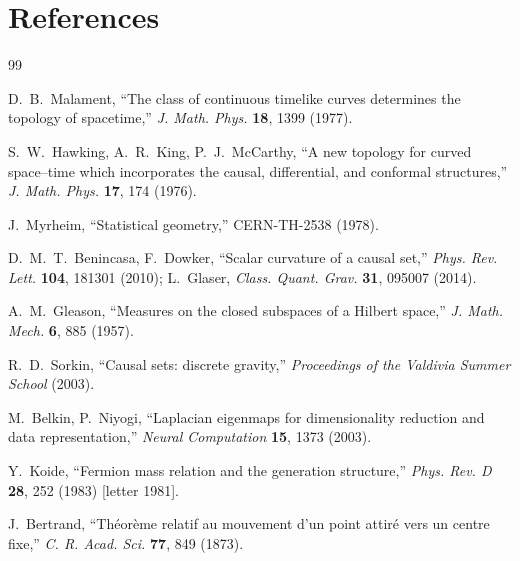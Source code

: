 \documentclass[10pt,twoside,openany]{book}
\begin{document}

\chapter{References}
\label{app:references}

\begin{thebibliography}{99}

D.~B.~Malament, ``The class of continuous timelike curves determines the topology of
spacetime,'' \emph{J. Math. Phys.} \textbf{18}, 1399 (1977).

S.~W.~Hawking, A.~R.~King, P.~J.~McCarthy, ``A new topology for curved space--time which
incorporates the causal, differential, and conformal structures,'' \emph{J. Math. Phys.}
\textbf{17}, 174 (1976).

J.~Myrheim, ``Statistical geometry,'' CERN-TH-2538 (1978).

D.~M.~T.~Benincasa, F.~Dowker, ``Scalar curvature of a causal set,'' \emph{Phys. Rev. Lett.}
\textbf{104}, 181301 (2010); L.~Glaser, \emph{Class. Quant. Grav.} \textbf{31}, 095007
(2014).

A.~M.~Gleason, ``Measures on the closed subspaces of a Hilbert space,''
\emph{J. Math. Mech.} \textbf{6}, 885 (1957).

R.~D.~Sorkin, ``Causal sets: discrete gravity,'' \emph{Proceedings of the Valdivia Summer
School} (2003).

M.~Belkin, P.~Niyogi, ``Laplacian eigenmaps for dimensionality reduction and data
representation,'' \emph{Neural Computation} \textbf{15}, 1373 (2003).

Y.~Koide, ``Fermion mass relation and the generation structure,'' \emph{Phys. Rev. D}
\textbf{28}, 252 (1983) [letter 1981].

J.~Bertrand, ``Th\'eor\`eme relatif au mouvement d'un point attir\'e vers un centre fixe,''
\emph{C. R. Acad. Sci.} \textbf{77}, 849 (1873).

\end{thebibliography}
\end{document}
